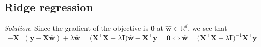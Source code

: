 \documentclass{article}
\numberwithin{equation}{section}
\begin{document}
\subsection{Ridge regression}

\textit{Solution.} Since the gradient of the objective is $ \mathbf{0} $ at $ \hat{\mathbf{w}} \in \mathbb{R}^d $, we see that
\begin{equation*}
    -\mathbf{X}^\top(\mathbf{y} - \mathbf{X}\hat{\mathbf{w}}) +
    \lambda\hat{\mathbf{w}} =
    \big(\mathbf{X}^\top\mathbf{X} + \lambda\mathbf{I}\big)\hat{\mathbf{w}}
    - \mathbf{X}^\top\mathbf{y} = \mathbf{0} \Leftrightarrow
    \hat{\mathbf{w}} = \big(
        \mathbf{X}^\top\mathbf{X} + \lambda\mathbf{I}
    \big)^{-1}\mathbf{X}^\top\mathbf{y}
\end{equation*}
\end{document}
